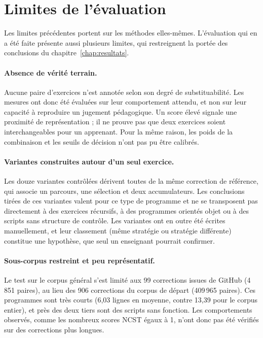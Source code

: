 \documentclass[12pt,a4paper,oneside]{report}
\begin{document}
\section{Limites de l'évaluation}

Les limites précédentes portent sur les méthodes elles-mêmes. L'évaluation
qui en a été faite présente aussi plusieurs limites, qui restreignent la
portée des conclusions du chapitre~\ref{chap:resultats}.

\paragraph{Absence de vérité terrain.}
Aucune paire d'exercices n'est annotée selon son degré de substituabilité.
Les mesures ont donc été évaluées sur leur comportement attendu, et non sur
leur capacité à reproduire un jugement pédagogique. Un score élevé signale
une proximité de représentation ; il ne prouve pas que deux exercices
soient interchangeables pour un apprenant. Pour la même raison, les poids
de la combinaison et les seuils de décision n'ont pas pu être calibrés.

\paragraph{Variantes construites autour d'un seul exercice.}
Les douze variantes contrôlées dérivent toutes de la même correction de
référence, qui associe un parcours, une sélection et deux accumulateurs.
Les conclusions tirées de ces variantes valent pour ce type de programme et
ne se transposent pas directement à des exercices récursifs, à des
programmes orientés objet ou à des scripts sans structure de contrôle. Les
variantes ont en outre été écrites manuellement, et leur classement (même
stratégie ou stratégie différente) constitue une hypothèse, que seul un
enseignant pourrait confirmer.

\paragraph{Sous-corpus restreint et peu représentatif.}
Le test sur le corpus général s'est limité aux 99 corrections issues de
GitHub (4\,851 paires), au lieu des 906 corrections du corpus de départ
(409\,965 paires). Ces programmes sont très courts
(6,03 lignes en moyenne, contre 13,39 pour le corpus entier), et près des
deux tiers sont des scripts sans fonction. Les comportements observés,
comme les nombreux scores NCST égaux à 1, n'ont donc pas été vérifiés sur
des corrections plus longues.
\end{document}
